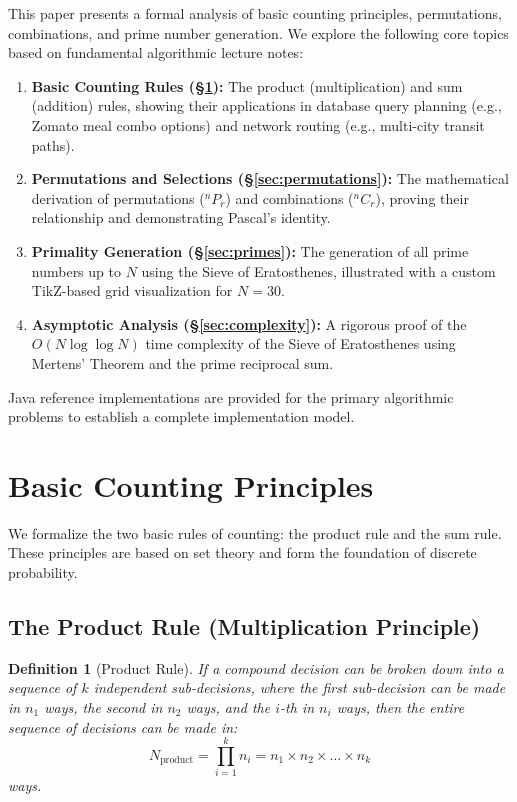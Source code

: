 \documentclass[10pt,journal,compsoc,onecolumn]{IEEEtran}
\newtheorem{definition}[theorem]{Definition}
\begin{document}
This paper presents a formal analysis of basic counting principles, permutations, combinations, and prime number generation. We explore the following core topics based on fundamental algorithmic lecture notes:
\begin{enumerate}
    \item \textbf{Basic Counting Rules (\S\ref{sec:counting}):} The product (multiplication) and sum (addition) rules, showing their applications in database query planning (e.g., Zomato meal combo options) and network routing (e.g., multi-city transit paths).
    \item \textbf{Permutations and Selections (\S\ref{sec:permutations}):} The mathematical derivation of permutations ($^nP_r$) and combinations ($^nC_r$), proving their relationship and demonstrating Pascal's identity.
    \item \textbf{Primality Generation (\S\ref{sec:primes}):} The generation of all prime numbers up to $N$ using the Sieve of Eratosthenes, illustrated with a custom TikZ-based grid visualization for $N=30$.
    \item \textbf{Asymptotic Analysis (\S\ref{sec:complexity}):} A rigorous proof of the $O(N \log \log N)$ time complexity of the Sieve of Eratosthenes using Mertens' Theorem and the prime reciprocal sum.
\end{enumerate}

Java reference implementations are provided for the primary algorithmic problems to establish a complete implementation model.

\section{Basic Counting Principles}
\label{sec:counting}

We formalize the two basic rules of counting: the product rule and the sum rule. These principles are based on set theory and form the foundation of discrete probability.

\subsection{The Product Rule (Multiplication Principle)}
\begin{definition}[Product Rule]
If a compound decision can be broken down into a sequence of $k$ independent sub-decisions, where the first sub-decision can be made in $n_1$ ways, the second in $n_2$ ways, and the $i$-th in $n_i$ ways, then the entire sequence of decisions can be made in:
\[
N_{\text{product}} = \prod_{i=1}^{k} n_i = n_1 \times n_2 \times \dots \times n_k
\]
ways.
\end{definition}
\end{document}
